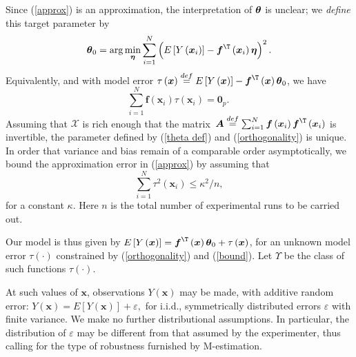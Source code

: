 \documentclass[times, authoryear, 12pt, twoside]{elsarticle}
\begin{document}
Since (\ref{approx}) is an approximation, the interpretation of $\boldsymbol{%
\theta }$ is unclear; we \textit{define }this target parameter by 
\begin{equation}
\boldsymbol{\theta }_{0}=\arg \min_{\boldsymbol{\eta }}\sum_{i=1}^{N}\left( E%
\left[ Y\left( \boldsymbol{x}_{i}\right) \right] -\boldsymbol{f}^{\T
}\left( \boldsymbol{x}_{i}\right) \boldsymbol{\eta }\right) ^{2}.
\label{theta def}
\end{equation}%
Equivalently, and with model error $\tau \left( \boldsymbol{x}\right) \overset{def}{=}E%
\left[ Y\left( \boldsymbol{x}\right) \right] -\boldsymbol{f}^{\T }\left( 
\boldsymbol{x}\right) \boldsymbol{\theta }_{0}$, we have 
\begin{equation}
\sum_{i=1}^{N}\boldsymbol{f}\left( \boldsymbol{x}_{i}\right) \tau \left( 
\boldsymbol{x}_{i}\right) =\boldsymbol{0}_p.\   \label{orthogonality}
\end{equation}%
Assuming that $\mathcal{X}$ is rich enough that the matrix\ $\boldsymbol{A}%
\overset{def}{=}\sum_{i=1}^{N}\boldsymbol{f}\left( \boldsymbol{x}_{i}\right) 
\boldsymbol{f}^{\T }\left( \boldsymbol{x}_{i}\right) $ is invertible,
the parameter defined by (\ref{theta def}) and (\ref{orthogonality}) is
unique. In order that variance and bias remain of a comparable order
asymptotically, we bound the approximation error in (\ref{approx}) by
assuming that%
\begin{equation}
\sum_{i=1}^{N}\tau ^{2}\left( \boldsymbol{x}_{i}\right) \leq \kappa ^{2}/n,
\label{bound}
\end{equation}%
for a constant $\kappa $. Here $n$ is the total number of experimental runs to be carried out.

Our model is thus given by $E\left[ Y\left( \boldsymbol{x}\right) \right] =%
\boldsymbol{f}^{\T }\left( \boldsymbol{x}\right) \boldsymbol{\theta }%
_{0}+\tau \left( \boldsymbol{x}\right) $, for an unknown model error $\tau
\left( \boldsymbol{\cdot }\right) $ constrained by (\ref{orthogonality}) and
(\ref{bound}). Let $\Upsilon $ be the class of such functions $\tau \left( 
\boldsymbol{\cdot }\right) $.

At such values of $\boldsymbol{x}$, observations $Y\left( \boldsymbol{x}%
\right) $ may be made, with additive random error: $Y\left( \boldsymbol{x}%
\right) =E\left[ Y\left( \boldsymbol{x}\right) \right] +\varepsilon ,$ for
i.i.d., symmetrically distributed errors $\varepsilon $ with finite variance. We make no further distributional assumptions. In particular, the distribution of $\varepsilon $ may be different from that assumed by the experimenter, thus calling for the type of robustness furnished by M-estimation.
\end{document}
